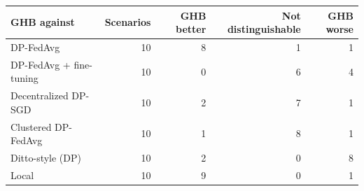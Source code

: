 \begin{tabular}{lrrrr}
\toprule
GHB against & Scenarios & GHB better & Not distinguishable & GHB worse \\
\midrule
DP-FedAvg \cite{mcmahan2018learning} & 10 & 8 & 1 & 1 \\
DP-FedAvg + fine-tuning \cite{mcmahan2018learning} & 10 & 0 & 6 & 4 \\
Decentralized DP-SGD \cite{lian2017can} & 10 & 2 & 7 & 1 \\
Clustered DP-FedAvg \cite{ghosh2020efficient,mcmahan2018learning} & 10 & 1 & 8 & 1 \\
Ditto-style (DP) \cite{li2021ditto} & 10 & 2 & 0 & 8 \\
Local & 10 & 9 & 0 & 1 \\
\bottomrule
\end{tabular}
